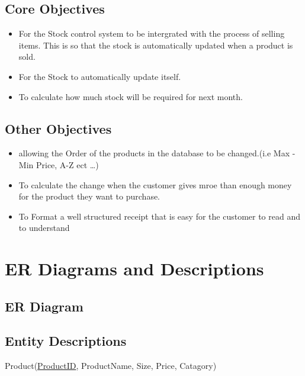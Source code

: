 \subsection{Core Objectives}

\begin{flushleft}
\begin{itemize}
	\item For the Stock control system to be intergrated with the process of selling items. This is so that the stock is automatically updated when a product is sold.
	\item For the Stock to automatically update itself.
	\item To calculate how much stock will be required for next month.
\end{itemize}
\end{flushleft}

\subsection{Other Objectives}

\begin{flushleft}
\begin{itemize}
	 \item allowing the Order of the products in the database to be changed.(i.e Max - Min Price, A-Z ect \ldots)
	 \item To calculate the change when the customer gives mroe than enough money for the product they want to purchase.
	 \item To Format a well structured receipt that is easy for the customer to read and to understand
\end{itemize}
\end{flushleft}


\section{ER Diagrams and Descriptions}

\subsection{ER Diagram}

\subsection{Entity Descriptions}


\begin{flushleft}

Product(\underline{ProductID}, ProductName, Size, Price, Catagory)

\end{flushleft}

